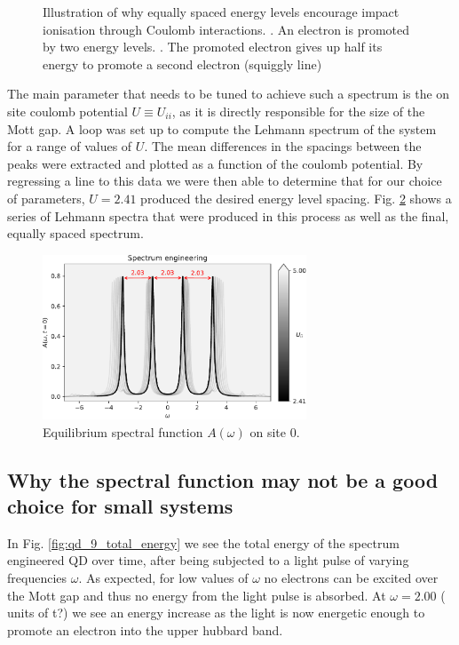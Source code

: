 \begin{figure}[!hbt]
    \captionsetup{singlelinecheck=off}
    \caption{Illustration of why equally spaced energy levels encourage impact ionisation through Coulomb interactions.
    . An electron is promoted by two energy levels. 
    . The promoted electron gives up half its energy to promote a second electron (squiggly line)}
    \label{fig:qd_spectrum_delta}
\end{figure}

The main parameter that needs to be tuned to achieve such a spectrum is the on site coulomb potential $U \equiv U_{ii}$, as it is directly responsible for the size of the Mott gap. A loop was set up to compute the Lehmann spectrum of the system for a range of values of $U$. The mean differences in the spacings between the peaks were extracted and plotted as a function of the coulomb potential. By regressing a line to this data we were then able to determine that for our choice of parameters, $U = 2.41$ produced the desired energy level spacing. Fig. \ref{fig:spectrum_engineering} shows a series of Lehmann spectra that were produced in this process as well as the final, equally spaced spectrum.


\begin{figure}[!hbt]
    \centering
    \includegraphics[width=0.7\textwidth]{graph/spectrum_engineering.pdf}
    \caption{Equilibrium spectral function $A(\omega)$ on site 0.}
    \label{fig:spectrum_engineering}
\end{figure}

\subsection{Why the spectral function may not be a good choice for small systems}
In Fig. \ref{fig:qd_9_total_energy} we see the total energy of the spectrum engineered QD over time, after being subjected to a light pulse of varying frequencies $\omega$. As expected, for low values of $\omega$ no electrons can be excited over the Mott gap and thus no energy from the light pulse is absorbed. At $\omega = 2.00$ (\color{red} units of t?\color{black}) we see an energy increase as the light is now energetic enough to promote an electron into the upper hubbard band.


